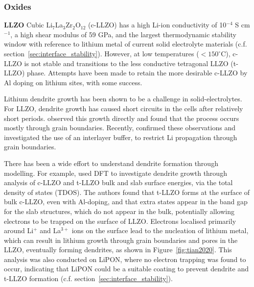 \documentclass[../main.tex]{subfiles}
\begin{document}
\subsubsection{Oxides}
\label{sec:se_oxides}
\textbf{LLZO} Cubic Li$_7$La$_3$Zr$_2$O$_{12}$ (c-LLZO) has a high Li-ion conductivity of 10$^{-4}$ S cm$^{-1}$,\cite{Murugan2007} a high shear modulus of 59 GPa,\cite{Ni2012} and the largest thermodynamic stability window with reference to lithium metal\cite{Zhu2016, Zhu2015, Binninger2020} of current solid electrolyte materials (c.f. section~\ref{sec:interface_stability}). However, at low temperatures ($<150 ^\circ$C), c-LLZO is not stable and transitions to the less conductive tetragonal LLZO (t-LLZO) phase.\cite{Geiger2011} Attempts have been made to retain the more desirable c-LLZO by Al doping on lithium sites, with some success.\cite{Geiger2011, Rangasamy2012}

Lithium dendrite growth has been shown to be a challenge in solid-electrolytes. For LLZO, dendrite growth has caused short circuits in the cells after relatively short periods.\cite{Ren2015,Sudo2014} \citeauthor{Cheng2017} observed this growth directly and found that the process occurs mostly through grain boundaries.\cite{Cheng2017} Recently, \citeauthor{Kim2020} confirmed these observations and investigated the use of an interlayer buffer, to restrict Li propagation through grain boundaries.\cite{Kim2020}

There has been a wide effort to understand dendrite formation through modelling.\cite{Canepa2018, Tian2018, Gao2020} For example, \citeauthor{Tian2018} used DFT to investigate dendrite growth through analysis of c-LLZO and t-LLZO bulk and slab surface energies, via the total density of states (TDOS).\cite{Tian2018} The authors found that t-LLZO forms at the surface of bulk c-LLZO, even with Al-doping,\cite{Ma2016, Rettenwander2018} and that extra states appear in the band gap for the slab structures, which do not appear in the bulk, potentially allowing electrons to be trapped on the surface of LLZO. Electrons localised primarily around Li$^+$ and La$^{3+}$ ions on the surface lead to the nucleation of lithium metal, which can result in lithium growth through grain boundaries and pores in the LLZO, eventually forming dendrites,\cite{Ren2015} as shown in Figure~\ref{fig:tian2020}. This analysis was also conducted on LiPON, where no electron trapping was found to occur, indicating that LiPON could be a suitable coating to prevent dendrite and t-LLZO formation (c.f. section~\ref{sec:interface_stability}).
\end{document}
